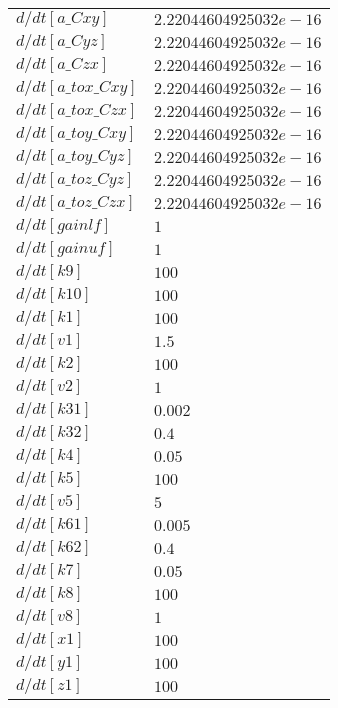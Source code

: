 \documentclass[10pt,a4paper]{article}
\begin{document}
\begin{table}[ht]
\centering
\begin{tabular}{ll}
  \hline
  \hline
$d/dt[ a\_Cxy]$ & $ 2.22044604925032e-16 $ \\ 
  $d/dt[ a\_Cyz]$ & $ 2.22044604925032e-16 $ \\ 
  $d/dt[ a\_Czx]$ & $ 2.22044604925032e-16 $ \\ 
  $d/dt[ a\_tox\_Cxy]$ & $ 2.22044604925032e-16 $ \\ 
  $d/dt[ a\_tox\_Czx]$ & $ 2.22044604925032e-16 $ \\ 
  $d/dt[ a\_toy\_Cxy]$ & $ 2.22044604925032e-16 $ \\ 
  $d/dt[ a\_toy\_Cyz]$ & $ 2.22044604925032e-16 $ \\ 
  $d/dt[ a\_toz\_Cyz]$ & $ 2.22044604925032e-16 $ \\ 
  $d/dt[ a\_toz\_Czx]$ & $ 2.22044604925032e-16 $ \\ 
  $d/dt[ gainlf]$ & $ 1 $ \\ 
  $d/dt[ gainuf]$ & $ 1 $ \\ 
  $d/dt[ k9]$ & $ 100 $ \\ 
  $d/dt[ k10]$ & $ 100 $ \\ 
  $d/dt[ k1]$ & $ 100 $ \\ 
  $d/dt[ v1]$ & $ 1.5 $ \\ 
  $d/dt[ k2]$ & $ 100 $ \\ 
  $d/dt[ v2]$ & $ 1 $ \\ 
  $d/dt[ k31]$ & $ 0.002 $ \\ 
  $d/dt[ k32]$ & $ 0.4 $ \\ 
  $d/dt[ k4]$ & $ 0.05 $ \\ 
  $d/dt[ k5]$ & $ 100 $ \\ 
  $d/dt[ v5]$ & $ 5 $ \\ 
  $d/dt[ k61]$ & $ 0.005 $ \\ 
  $d/dt[ k62]$ & $ 0.4 $ \\ 
  $d/dt[ k7]$ & $ 0.05 $ \\ 
  $d/dt[ k8]$ & $ 100 $ \\ 
  $d/dt[ v8]$ & $ 1 $ \\ 
  $d/dt[ x1]$ & $ 100 $ \\ 
  $d/dt[ y1]$ & $ 100 $ \\ 
  $d/dt[ z1]$ & $ 100 $ \\ 
   \hline
\end{tabular}
\end{table}
 
\end{document}
